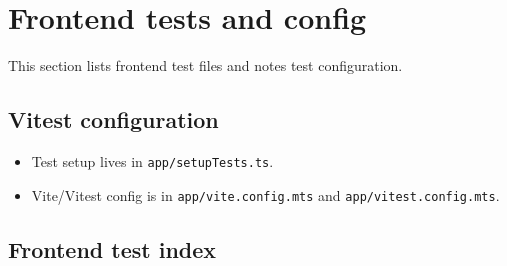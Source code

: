 \section{Frontend tests and config}
\label{sec:tests:frontend:index}

This section lists frontend test files and notes test configuration.

\subsection{Vitest configuration}
\label{subsec:tests:frontend:config}

\begin{itemize}
  \item Test setup lives in \texttt{app/setupTests.ts}.
  \item Vite/Vitest config is in \texttt{app/vite.config.mts} and \texttt{app/vitest.config.mts}.
\end{itemize}

\subsection{Frontend test index}
\label{subsec:tests:frontend:index}

